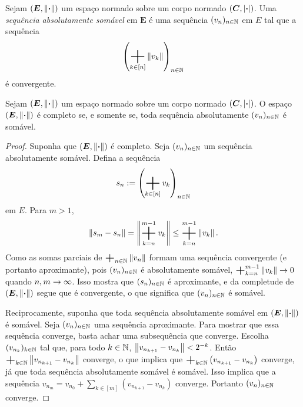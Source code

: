 \begin{defi}
Sejam $(\bm E,\left\Vert{\bm{\cdot}}\right\Vert)$ um espaço normado sobre um corpo normado $(\bm C,\left\vert{\bm{\cdot}}\right\vert)$. Uma \emph{sequência absolutamente somável} em $\bm E$ é uma sequência $(v_n)_{n \in \mathbb{N}}$ em $E$ tal que a sequência
	\begin{equation*}
	\left( \sum_{k \in [n]} \nor{v_k} \right)_{n \in \N}
	\end{equation*}
é convergente.
\end{defi}

\begin{prop}
\label{ana:prop.abs.som.e.som}
Sejam $(\bm E,\left\Vert{\bm{\cdot}}\right\Vert)$ um espaço normado sobre um corpo normado $(\bm C,\left\vert{\bm{\cdot}}\right\vert)$. O espaço $(\bm E,\left\Vert{\bm{\cdot}}\right\Vert)$ é completo se, e somente se, toda sequência absolutamente $(v_n)_{n \in \mathbb{N}}$ é somável.
\end{prop}
\begin{proof}
Suponha que $(\bm E,\left\Vert{\bm{\cdot}}\right\Vert)$ é completo. Seja $(v_n)_{n \in \mathbb{N}}$ um sequência absolutamente somável. Defina a sequência
	\begin{equation*}
	s_n := \left( \sum_{k \in [n]} v_k \right)_{n \in \N}
	\end{equation*}
em $E$. Para $m>1$,
	\begin{equation*}
	\nor{s_m - s_n} = \nor{\sum_{k=n}^{m-1} v_k} \leq \sum_{k=n}^{m-1} \nor{v_k}.
	\end{equation*}
Como as somas parciais de $\sum_{n \in \N} \nor{v_n}$ formam uma sequência convergente (e portanto aproximante), pois $(v_n)_{n \in \mathbb{N}}$ é absolutamente somável, $\sum_{k=n}^{m-1} \nor{v_k} \conv 0$ quando $n,m \rightarrow \infty$. Isso mostra que $(s_n)_{n \in \mathbb{N}}$ é aproximante, e da completude de $(\bm E,\left\Vert{\bm{\cdot}}\right\Vert)$ segue que é convergente, o que significa que $(v_n)_{n \in \mathbb{N}}$ é somável.

Reciprocamente, suponha que toda sequência absolutamente somável em $(\bm E,\left\Vert{\bm{\cdot}}\right\Vert)$ é somável. Seja $(v_n)_{n \in \mathbb{N}}$ uma sequência aproximante. Para mostrar que essa sequência converge, basta achar uma subsequência que converge. Escolha $(v_{n_k})_{k \in \mathbb{N}}$ tal que, para todo $k \in \mathbb{N}$, $\left\Vert{v_{n_{k+1}} - v_{n_k}}\right\Vert < 2^{-k}$. Então $\sum_{k \in \N} \nor{v_{n_{k+1}} - v_{n_k}}$ converge, o que implica que $\sum_{k \in \N} \left( v_{n_{k+1}} - v_{n_k} \right)$ converge, já que toda sequência absolutamente somável é somável. Isso implica que a sequência $v_{n_m} = v_{n_0} + \sum_{k \in [m]} \left( v_{n_{k+1}} - v_{n_k} \right)$ converge. Portanto $(v_n)_{n \in \mathbb{N}}$ converge.
\end{proof}

